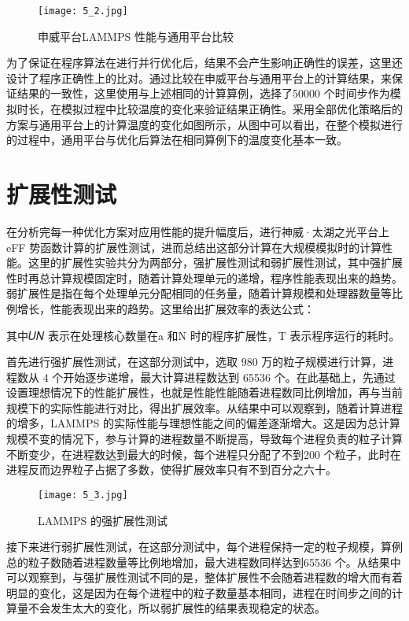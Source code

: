  \begin{figure}[h]
  \centering
  \texttt{[image: 5\_2.jpg]}
  \caption{申威平台LAMMPS 性能与通用平台比较}
  \label{fig:badge}
\end{figure}

为了保证在程序算法在进行并行优化后，结果不会产生影响正确性的误差，这里还设计了程序正确性上的比对。通过比较在申威平台与通用平台上的计算结果，来保证结果的一致性，这里使用与上述相同的计算算例，选择了50000 个时间步作为模拟时长，在模拟过程中比较温度的变化来验证结果正确性。采用全部优化策略后的方案与通用平台上的计算温度的变化如图所示，从图中可以看出，在整个模拟进行的过程中，通用平台与优化后算法在相同算例下的温度变化基本一致。

\section{扩展性测试}
在分析完每一种优化方案对应用性能的提升幅度后，进行神威·太湖之光平台上 eFF 势函数计算的扩展性测试，进而总结出这部分计算在大规模模拟时的计算性能。这里的扩展性实验共分为两部分，强扩展性测试和弱扩展性测试，其中强扩展性时再总计算规模固定时，随着计算处理单元的递增，程序性能表现出来的趋势。弱扩展性是指在每个处理单元分配相同的任务量，随着计算规模和处理器数量等比例增长，性能表现出来的趋势。这里给出扩展效率的表达公式：

其中𝑈𝑁 表示在处理核心数量在a 和N 时的程序扩展性，T 表示程序运行的耗时。

首先进行强扩展性测试，在这部分测试中，选取 980 万的粒子规模进行计算，进程数从 4 个开始逐步递增，最大计算进程数达到 65536 个。在此基础上，先通过设置理想情况下的性能扩展性，也就是性能性能随着进程数同比例增加，再与当前规模下的实际性能进行对比，得出扩展效率。从结果中可以观察到，随着计算进程的增多，LAMMPS 的实际性能与理想性能之间的偏差逐渐增大。这是因为总计算规模不变的情况下，参与计算的进程数量不断提高，导致每个进程负责的粒子计算不断变少，在进程数达到最大的时候，每个进程只分配了不到200 个粒子，此时在进程反而边界粒子占据了多数，使得扩展效率只有不到百分之六十。

 \begin{figure}[h]
  \centering
  \texttt{[image: 5\_3.jpg]}
  \caption{LAMMPS 的强扩展性测试}
  \label{fig:badge}
\end{figure}

接下来进行弱扩展性测试，在这部分测试中，每个进程保持一定的粒子规模，算例总的粒子数随着进程数量等比例地增加，最大进程数同样达到65536 个。从结果中可以观察到，与强扩展性测试不同的是，整体扩展性不会随着进程数的增大而有着明显的变化，这是因为在每个进程中的粒子数量基本相同，进程在时间步之间的计算量不会发生太大的变化，所以弱扩展性的结果表现稳定的状态。

